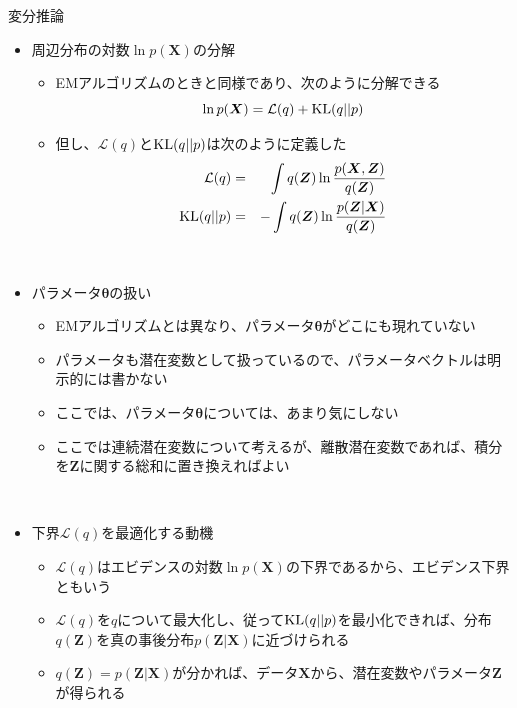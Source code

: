 \documentclass[dvipdfmx,notheorems,t]{beamer}
\begin{document}
\begin{frame}{変分推論}

\begin{itemize}
	\item 周辺分布の対数$\ln p(\bm{X})$の分解
	\begin{itemize}
		\item EMアルゴリズムのときと同様であり、次のように分解できる
		\begin{equation}
			\ln p(\bm{X}) = \mathcal{L}(q) + \operatorname{KL} (q || p)
		\end{equation}
		
		\item 但し、$\mathcal{L}(q)$と$\operatorname{KL} (q || p)$は次のように定義した
		\begin{eqnarray}
			\mathcal{L}(q) &=& \int q(\bm{Z}) \ln \frac{p(\bm{X}, \bm{Z})}{q(\bm{Z})} \\
			\operatorname{KL} (q || p) &=& -\int q(\bm{Z}) \ln \frac{p(\bm{Z} | \bm{X})}{q(\bm{Z})}
		\end{eqnarray}
	\end{itemize} \
		
	\item パラメータ$\bm{\theta}$の扱い
	\begin{itemize}
		\item EMアルゴリズムとは異なり、\color{red}パラメータ$\bm{\theta}$がどこにも現れていない\normalcolor
		\item \alert{パラメータも潜在変数として扱っている}ので、パラメータベクトルは明示的には書かない
		\item ここでは、パラメータ$\bm{\theta}$については、あまり気にしない
		\newline
		\item ここでは連続潜在変数について考えるが、離散潜在変数であれば、積分を$\bm{Z}$に関する総和に置き換えればよい
	\end{itemize} \
	
	\item 下界$\mathcal{L}(q)$を最適化する動機
	\begin{itemize}
		\item $\mathcal{L}(q)$はエビデンスの対数$\ln p(\bm{X})$の下界であるから、\alert{エビデンス下界}ともいう
		\newline
		
		\item $\mathcal{L}(q)$を$q$について最大化し、従って$\operatorname{KL} (q || p)$を最小化できれば、分布$q(\bm{Z})$を真の事後分布$p(\bm{Z} | \bm{X})$に近づけられる
		\item $q(\bm{Z}) = p(\bm{Z} | \bm{X})$が分かれば、データ$\bm{X}$から、\color{red}潜在変数やパラメータ$\bm{Z}$が得られる\normalcolor
	\end{itemize} \
	

\end{itemize}
\end{frame}
\end{document}
